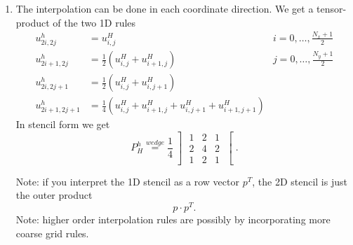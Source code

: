 \begin{enumerate}[label=\Alph{enumi})]
\begin{enumerate}[label=\underline{\arabic{enumi}D}]
	\item The interpolation can be done in each coordinate direction.
		We get a tensor-product of the two 1D rules
		\begin{align*}
			u_{2i, 2j}^{h} &= u_{i,j}^{H} &i=0, \ldots, \frac{N_{x}+1}{2} \\
			u_{2i+1, 2j}^{h} &= \frac{1}{2}(u_{i,j}^{H}+u_{i+1,j}^{H}) &j=0, \ldots, \frac{N_{y}+1}{2} \\
			u_{2i,2j+1}^{h} &= \frac{1}{2}(u_{i,j}^{H}+u_{i,j+1}^{H}) \\
			u_{2i+1, 2j+1}^{h} &= \frac{1}{4}(u_{i,j}^{H}+ u_{i+1,j}^{H}+ u_{i,j+1}^{H}+ u_{i+1,j+1}^{H})
		\end{align*}
		In stencil form we get
		\[
			P_{H}^{h} \overset{wedge}{=} \frac{1}{4}
			\left]
			\begin{matrix}
				1 & 2 & 1 \\
				2 & 4 & 2 \\
				1 & 2 & 1 
			\end{matrix}
			\right[
		.\] 
		
		Note: if you interpret the 1D stencil as a row vector $p^{T}$, the 2D stencil is just the outer product 
		\[
		p\cdot p^{T}
		.\] 
		Note: higher order interpolation rules are possibly by incorporating more coarse grid rules.
		\end{enumerate}
		

\end{enumerate}

